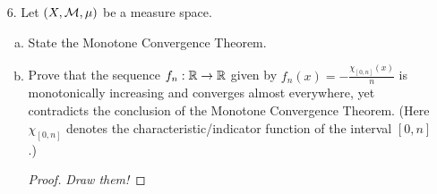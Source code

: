 \begin{itemize}
\begin{enumerate}[(a)]
\begin{proof}
\medskip 

(Intersection of dense is dense) $A \subseteq X$ is dense iff for all $\varepsilon > 0$, there exists $a \in A$ such that $d(x,a) < \varepsilon$. With this in mind, let $\{A_i\}_{i=1}^n$ be dense, with $x \in \cap A_i$. Then for all $\varepsilon_i > 0$, there exists $a_i \in A_i$ such that $d(x,a_i) < \varepsilon_i$. For $\varepsilon := \min\{\varepsilon_i\}$, then for all $a \in \cap A_i$ we have $d(x,a) \leq d(x,a_i) < \varepsilon$. Thus $\cap A_i$ is dense. 
\end{proof}

\item Prove that there exists a set with Lebesgue measure $0$ which is a countable intersection of sets which are open and dense in $\bbr$.
\begin{proof}
By the Lebesgue Regularization Theorem, for any measurable $A \subseteq \bbr$ there exists a G$_{\delta}$ set $G$ such that $A \subseteq G$ and $\lambda(G \setminus A) = 0$. Unfortunately, this says nothing about density, so we must construct an example. 

\medskip 

Let $Q = \bbq \cap [0,1]$ and enumerate $q_n \in Q$ via the naturals. Let $A_{\varepsilon} = \bigcup_{q_n \in Q} (q_n - \frac{\varepsilon}{2^{n+1}}, \ q_n + \frac{\varepsilon}{2^{n+1}})$. Each $A_{\varepsilon}$ is open and dense, with $\lambda(A_{\varepsilon}) \leq \varepsilon$. Taking $A = \bigcap_{m=1}^{\infty} A_{1/m}$ then gives a countable intersection of open and dense sets such that $\lambda(A)<\varepsilon$.
\end{proof}
\end{enumerate}





\item[6.] Let $(X,\mathcal{M}, \mu)$ be a measure space.
\begin{enumerate}[(a)]
\item State the Monotone Convergence Theorem.

\item Prove that the sequence $f_n : \mathbb{R} \rightarrow \mathbb{R}$ given by $f_n(x) = -\frac{\chi_{[0,n]}(x)}{n}$ is monotonically
increasing and converges almost everywhere, yet contradicts the conclusion of the
Monotone Convergence Theorem. (Here $\chi_{[0,n]}$ denotes the characteristic/indicator
function of the interval $[0, n]$.)
\begin{proof}
\textit{Draw them!}


\end{proof}
\end{enumerate}
\end{itemize}
